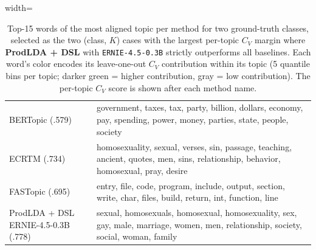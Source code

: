 \begin{table}[t]
\begin{adjustbox}{width=\linewidth}
\begin{tabular}{@{}l l@{}}
    {\tiny BERTopic (.579)} & \textcolor{green!90!black}{government}, \textcolor{green!60!black}{taxes}, \textcolor{green!40!black}{tax}, \textcolor{black!40}{party}, \textcolor{black!70}{billion}, \textcolor{green!40!black}{dollars}, \textcolor{green!60!black}{economy}, \textcolor{green!40!black}{pay}, \textcolor{green!90!black}{spending}, \textcolor{black!70}{power}, \textcolor{green!60!black}{money}, \textcolor{black!40}{parties}, \textcolor{black!70}{state}, \textcolor{black!40}{people}, \textcolor{green!90!black}{society} \\
    {\tiny ECRTM (.734)} & \textcolor{green!60!black}{homosexuality}, \textcolor{black!70}{sexual}, \textcolor{green!40!black}{verses}, \textcolor{green!90!black}{sin}, \textcolor{green!40!black}{passage}, \textcolor{black!40}{teaching}, \textcolor{black!70}{ancient}, \textcolor{black!40}{quotes}, \textcolor{green!60!black}{men}, \textcolor{green!90!black}{sins}, \textcolor{black!40}{relationship}, \textcolor{black!70}{behavior}, \textcolor{green!90!black}{homosexual}, \textcolor{green!60!black}{pray}, \textcolor{green!40!black}{desire} \\
    {\tiny FASTopic (.695)} & \textcolor{green!60!black}{entry}, \textcolor{green!60!black}{file}, \textcolor{green!40!black}{code}, \textcolor{black!70}{program}, \textcolor{black!70}{include}, \textcolor{green!90!black}{output}, \textcolor{black!70}{section}, \textcolor{green!60!black}{write}, \textcolor{green!90!black}{char}, \textcolor{green!40!black}{files}, \textcolor{black!40}{build}, \textcolor{black!40}{return}, \textcolor{green!90!black}{int}, \textcolor{black!40}{function}, \textcolor{green!40!black}{line} \\
    {\tiny ProdLDA + DSL ERNIE-4.5-0.3B (.778)} & \textcolor{green!90!black}{sexual}, \textcolor{green!60!black}{homosexuals}, \textcolor{green!60!black}{homosexual}, \textcolor{green!90!black}{homosexuality}, \textcolor{green!90!black}{sex}, \textcolor{green!60!black}{gay}, \textcolor{green!40!black}{male}, \textcolor{green!40!black}{marriage}, \textcolor{black!40}{women}, \textcolor{green!40!black}{men}, \textcolor{black!70}{relationship}, \textcolor{black!70}{society}, \textcolor{black!40}{social}, \textcolor{black!70}{woman}, \textcolor{black!40}{family} \\
    \bottomrule
    \end{tabular}
    \end{adjustbox}

    \caption{Top-15 words of the most aligned topic per method for two ground-truth classes, selected as the two (class, $K$) cases with the largest per-topic $C_V$ margin where \textbf{ProdLDA + DSL} with \texttt{ERNIE-4.5-0.3B} strictly outperforms all baselines. Each word's color encodes its leave-one-out $C_V$ contribution within its topic (5 quantile bins per topic; darker green = higher contribution, gray = low contribution). The per-topic $C_V$ score is shown after each method name.}
    \vspace{-2ex}
    \label{tab:20newsgroup-topic-visualization}
    \end{table}
